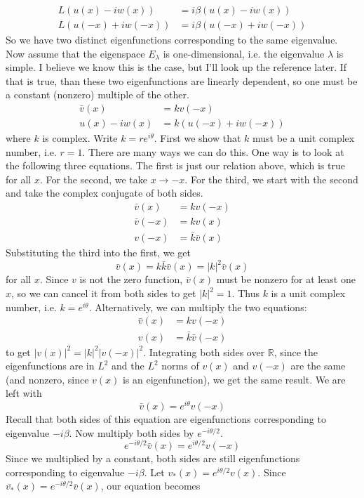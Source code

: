 \documentclass[12pt]{article}
\def\R{{\mathbb R}}
\begin{document}
\begin{align*}
	L( u(x) - i w(x) ) &= i \beta ( u(x) - i w(x) ) \\
	L( u(-x) + i w(-x) ) &= i \beta ( u(-x) + i w(-x) )
\end{align*} 
So we have two distinct eigenfunctions corresponding to the same eigenvalue. Now assume that the eigenspace $E_\lambda$ is one-dimensional, i.e. the eigenvalue $\lambda$ is simple. I believe we know this is the case, but I'll look up the reference later. If that is true, than these two eigenfunctions are linearly dependent, so one must be a constant (nonzero) multiple of the other.
\begin{align*}
\bar{v}(x) &= k v(-x) \\
u(x) - i w(x) &= k( u(-x) + i w(-x) )
\end{align*}
where $k$ is complex. Write $k = re^{i\theta}$. First we show that $k$ must be a unit complex number, i.e. $r = 1$. There are many ways we can do this. One way is to look at the following three equations. The first is just our relation above, which is true for all $x$. For the second, we take $x \rightarrow -x$. For the third, we start with the second and take the complex conjugate of both sides.
\begin{align*}
\bar{v}(x) &= k v(-x) \\
\bar{v}(-x) &= k v(x) \\
v(-x) &= \bar{k} \bar{v}(x) 
\end{align*}
Substituting the third into the first, we get
\[
\bar{v}(x) = k \bar{k} \bar{v}(x) = |k|^2\bar{v}(x)
\]
for all $x$. Since $v$ is not the zero function, $\bar{v}(x)$ must be nonzero for at least one $x$, so we can cancel it from both sides to get $|k|^2 = 1$. Thus $k$ is a unit complex number, i.e. $k = e^{i\theta}$. Alternatively, we can multiply the two equations:
\begin{align*}
\bar{v}(x) &= k v(-x) \\
v(x) &= \bar{k} \bar{v}(-x)
\end{align*}
to get $|v(x)|^2 = |k|^2 |v(-x)|^2$. Integrating both sides over $\R$, since the eigenfunctions are in $L^2$ and the $L^2$ norms of $v(x)$ and $v(-x)$ are the same (and nonzero, since $v(x)$ is an eigenfunction), we get the same result. We are left with
\[
\bar{v}(x) = e^{i\theta}v(-x)
\]
Recall that both sides of this equation are eigenfunctions corresponding to eigenvalue $-i \beta$. Now multiply both sides by $e^{-i\theta/2}$. 
\[
e^{-i\theta/2}\bar{v}(x) = e^{i\theta/2}v(-x)
\]
Since we multiplied by a constant, both sides are still eigenfunctions corresponding to eigenvalue $-i \beta$. Let $v_*(x) = e^{i\theta/2} v(x)$. Since $\bar{v_*}(x) = e^{-i\theta/2} \bar{v}(x)$, our equation becomes
\end{document}
